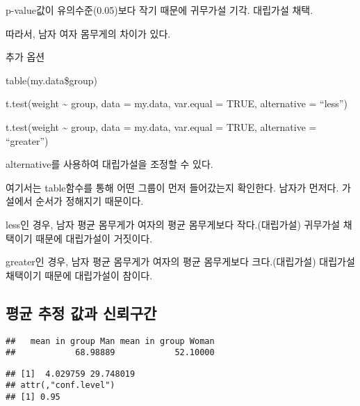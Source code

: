 \documentclass[
]{article}
\newenvironment{Shaded}{\begin{snugshade}}{\end{snugshade}}
\newcommand{\NormalTok}[1]{#1}
\newcommand{\SpecialCharTok}[1]{\textcolor[rgb]{0.00,0.00,0.00}{#1}}
\begin{document}
p-value값이 유의수준(0.05)보다 작기 때문에 귀무가설 기각. 대립가설 채택.

따라서, 남자 여자 몸무게의 차이가 있다.

추가 옵션

table(my.data\$group)

t.test(weight \textasciitilde{} group, data = my.data, var.equal = TRUE, alternative = ``less'')

t.test(weight \textasciitilde{} group, data = my.data, var.equal = TRUE, alternative = ``greater'')

alternative를 사용하여 대립가설을 조정할 수 있다.

여기서는 table함수를 통해 어떤 그룹이 먼저 들어갔는지 확인한다. 남자가 먼저다. 가설에서 순서가 정해지기 때문이다.

less인 경우, 남자 평균 몸무게가 여자의 평균 몸무게보다 작다.(대립가설) 귀무가설 채택이기 때문에 대립가설이 거짓이다.

greater인 경우, 남자 평균 몸무게가 여자의 평균 몸무게보다 크다.(대립가설) 대립가설 채택이기 때문에 대립가설이 참이다.

\hypertarget{uxd3c9uxade0-uxcd94uxc815-uxac12uxacfc-uxc2e0uxb8b0uxad6cuxac04-1}{%
\subsection{평균 추정 값과 신뢰구간}\label{uxd3c9uxade0-uxcd94uxc815-uxac12uxacfc-uxc2e0uxb8b0uxad6cuxac04-1}}

\begin{Shaded}
\end{Shaded}

\begin{verbatim}
##   mean in group Man mean in group Woman 
##            68.98889            52.10000
\end{verbatim}

\begin{Shaded}
\end{Shaded}

\begin{verbatim}
## [1]  4.029759 29.748019
## attr(,"conf.level")
## [1] 0.95
\end{verbatim}
\end{document}

